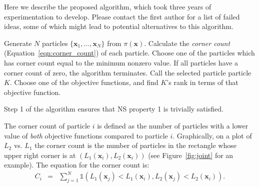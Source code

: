 \documentclass[journal,article,accept,moreauthors,pdftex,12pt,a4paper]{mdpi}
\newcommand{\xx}{\boldsymbol{x}}
\begin{document}
Here we describe the proposed algorithm, which took three years of
experimentation to develop. Please contact the first author for a list of
failed ideas, some of which might lead to potential alternatives to this
algorithm.

\begin{algorithm}
\begin{algorithmic}
\State Generate $N$ particles $\{\xx_1, ..., \xx_N\}$ from $\pi(\xx)$.
	\State Calculate the {\it corner count} (Equation~\ref{eqn:corner_count})
of each particle.
	\State Choose one of the particles which has corner count equal to the
minimum nonzero value. If all particles have a corner count of zero,
the algorithm terminates. Call the selected particle particle $K$.
	\State Choose one of the objective functions, and find $K$'s rank in terms
of that objective function.
\EndWhile
\end{algorithmic}
\end{algorithm}

Step 1 of the algorithm ensures that NS property 1 is trivially satisfied.

The corner count of particle $i$ is defined as the number of particles with
a lower value of {\em both} objective functions compared to particle $i$.
Graphically, on a plot of $L_2$ vs. $L_1$ the corner count is the number of
particles in the rectangle whose upper right corner is at
$\left(L_1(\xx_i), L_2(\xx_i)\right)$ (see Figure~\ref{fig:joint} for an
example). The equation for the corner count is:
\begin{eqnarray}
C_i &=& \sum_{j=1}^N \mathds{1}\left(L_1(\xx_j) < L_1(\xx_i),
L_2(\xx_j) < L_2(\xx_i)
\right).\label{eqn:corner_count}
\end{eqnarray}
\end{document}
